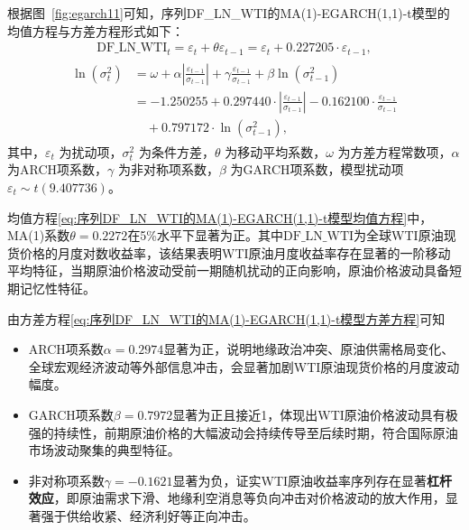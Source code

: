 \documentclass[12pt,a4paper]{ctexart}
\begin{document}
根据图~\ref{fig:egarch11}可知，序列DF\_LN\_WTI的MA(1)-EGARCH(1,1)-t模型的均值方程与方差方程形式如下：
\begin{align}\label{eq:序列DF_LN_WTI的MA(1)-EGARCH(1,1)-t模型均值方程}
\mathrm{DF}\_\mathrm{LN}\_\mathrm{WTI}_t=\varepsilon _t+\theta \varepsilon _{t-1}=\varepsilon _t+0.227205\cdot \varepsilon _{t-1},
\end{align}
\begin{gather}\label{eq:序列DF_LN_WTI的MA(1)-EGARCH(1,1)-t模型方差方程}
\begin{aligned}
\ln \left( \sigma _{t}^{2} \right) &=\omega +\alpha \left| \frac{\varepsilon _{t-1}}{\sigma _{t-1}} \right|+\gamma \frac{\varepsilon _{t-1}}{\sigma _{t-1}}+\beta \ln \left( \sigma _{t-1}^{2} \right) 
\\
&=-1.250255+0.297440\cdot \left| \frac{\varepsilon _{t-1}}{\sigma _{t-1}} \right|-0.162100\cdot \frac{\varepsilon _{t-1}}{\sigma _{t-1}}
\\
&\quad +0.797172\cdot \ln \left( \sigma _{t-1}^{2} \right) ,
\end{aligned}
\end{gather}
其中，$\varepsilon_t$ 为扰动项，$\sigma_t^2$ 为条件方差，$\theta$ 为移动平均系数，$\omega$ 为方差方程常数项，$\alpha$ 为ARCH项系数，$\gamma$ 为非对称项系数，$\beta$ 为GARCH项系数，模型扰动项$\varepsilon_t\sim t(9.407736)$。

均值方程\eqref{eq:序列DF_LN_WTI的MA(1)-EGARCH(1,1)-t模型均值方程}中，MA(1)系数$\theta=0.2272$在5\%水平下显著为正。其中$\mathrm{DF}\_\mathrm{LN}\_\mathrm{WTI}$为全球WTI原油现货价格的月度对数收益率，该结果表明WTI原油月度收益率存在显著的一阶移动平均特征，当期原油价格波动受前一期随机扰动的正向影响，原油价格波动具备短期记忆性特征。

由方差方程\eqref{eq:序列DF_LN_WTI的MA(1)-EGARCH(1,1)-t模型方差方程}可知
\begin{itemize}
\item ARCH项系数$\alpha=0.2974$显著为正，说明地缘政治冲突、原油供需格局变化、全球宏观经济波动等外部信息冲击，会显著加剧WTI原油现货价格的月度波动幅度。

\item GARCH项系数$\beta=0.7972$显著为正且接近1，体现出WTI原油价格波动具有极强的持续性，前期原油价格的大幅波动会持续传导至后续时期，符合国际原油市场波动聚集的典型特征。

\item 非对称项系数$\gamma=-0.1621$显著为负，证实WTI原油收益率序列存在显著\textbf{杠杆效应}，即原油需求下滑、地缘利空消息等负向冲击对价格波动的放大作用，显著强于供给收紧、经济利好等正向冲击。
\end{itemize}
\end{document}

